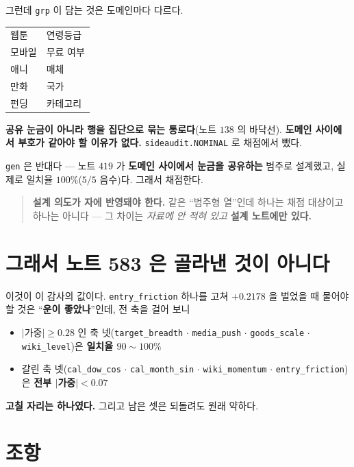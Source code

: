 \documentclass[11pt]{article}
\begin{document}
그런데 \texttt{grp} 이 담는 것은 도메인마다 다르다.

\begin{center}
\begin{tabular}{ll}
\hline
웹툰 & 연령등급 \\
모바일 & 무료 여부 \\
애니 & 매체 \\
만화 & 국가 \\
펀딩 & 카테고리 \\
\hline
\end{tabular}
\end{center}

\textbf{공유 눈금이 아니라 행을 집단으로 묶는 통로다}(노트 $138$ 의
바닥선). \textbf{도메인 사이에서 부호가 같아야 할 이유가 없다.}
\texttt{sideaudit.NOMINAL} 로 채점에서 뺐다.

\texttt{gen} 은 반대다 --- 노트 $419$ 가 \textbf{도메인 사이에서 눈금을
공유하는} 범주로 설계했고, 실제로 일치율 $100\%$($5/5$ 음수)다. 그래서
채점한다.

\begin{quote}
\textbf{설계 의도가 자에 반영돼야 한다.} 같은 ``범주형 열''인데 하나는
채점 대상이고 하나는 아니다 --- 그 차이는 \emph{자료에 안 적혀 있고}
\textbf{설계 노트에만 있다.}
\end{quote}

\section*{그래서 노트 583 은 골라낸 것이 아니다}

이것이 이 감사의 값이다. \texttt{entry\_friction} 하나를 고쳐
$+0.2178$ 을 벌었을 때 물어야 할 것은 ``\textbf{운이 좋았나}''인데,
전 축을 걸어 보니

\begin{itemize}
\item $|$가중$| \geq 0.28$ 인 축 넷(\texttt{target\_breadth} $\cdot$
\texttt{media\_push} $\cdot$ \texttt{goods\_scale} $\cdot$
\texttt{wiki\_level})은 \textbf{일치율 $90\!\sim\!100\%$}
\item 갈린 축 넷(\texttt{cal\_dow\_cos} $\cdot$ \texttt{cal\_month\_sin}
$\cdot$ \texttt{wiki\_momentum} $\cdot$ \texttt{entry\_friction})은
\textbf{전부 $|$가중$| < 0.07$}
\end{itemize}

\textbf{고칠 자리는 하나였다.} 그리고 남은 셋은 되돌려도 원래 약하다.

\section*{조항}
\end{document}
